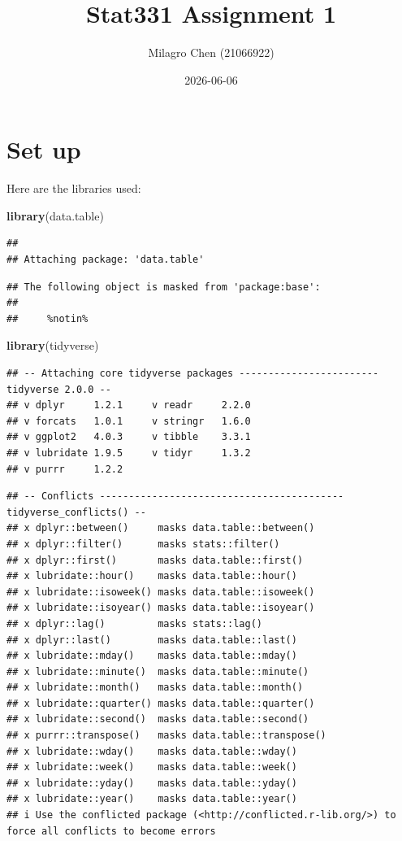 \documentclass[
]{article}
\title{Stat331 Assignment 1}
\author{Milagro Chen (21066922)}
\date{2026-06-06}
\newenvironment{Shaded}{\begin{snugshade}}{\end{snugshade}}
\newcommand{\FunctionTok}[1]{\textcolor[rgb]{0.13,0.29,0.53}{\textbf{#1}}}
\newcommand{\NormalTok}[1]{#1}
\begin{document}
\maketitle

\section{Set up}\label{set-up}

Here are the libraries used:

\begin{Shaded}
\begin{Highlighting}[]
\FunctionTok{library}\NormalTok{(data.table)}
\end{Highlighting}
\end{Shaded}

\begin{verbatim}
## 
## Attaching package: 'data.table'
\end{verbatim}

\begin{verbatim}
## The following object is masked from 'package:base':
## 
##     %notin%
\end{verbatim}

\begin{Shaded}
\begin{Highlighting}[]
\FunctionTok{library}\NormalTok{(tidyverse)}
\end{Highlighting}
\end{Shaded}

\begin{verbatim}
## -- Attaching core tidyverse packages ------------------------ tidyverse 2.0.0 --
## v dplyr     1.2.1     v readr     2.2.0
## v forcats   1.0.1     v stringr   1.6.0
## v ggplot2   4.0.3     v tibble    3.3.1
## v lubridate 1.9.5     v tidyr     1.3.2
## v purrr     1.2.2
\end{verbatim}

\begin{verbatim}
## -- Conflicts ------------------------------------------ tidyverse_conflicts() --
## x dplyr::between()     masks data.table::between()
## x dplyr::filter()      masks stats::filter()
## x dplyr::first()       masks data.table::first()
## x lubridate::hour()    masks data.table::hour()
## x lubridate::isoweek() masks data.table::isoweek()
## x lubridate::isoyear() masks data.table::isoyear()
## x dplyr::lag()         masks stats::lag()
## x dplyr::last()        masks data.table::last()
## x lubridate::mday()    masks data.table::mday()
## x lubridate::minute()  masks data.table::minute()
## x lubridate::month()   masks data.table::month()
## x lubridate::quarter() masks data.table::quarter()
## x lubridate::second()  masks data.table::second()
## x purrr::transpose()   masks data.table::transpose()
## x lubridate::wday()    masks data.table::wday()
## x lubridate::week()    masks data.table::week()
## x lubridate::yday()    masks data.table::yday()
## x lubridate::year()    masks data.table::year()
## i Use the conflicted package (<http://conflicted.r-lib.org/>) to force all conflicts to become errors
\end{verbatim}
\end{document}

